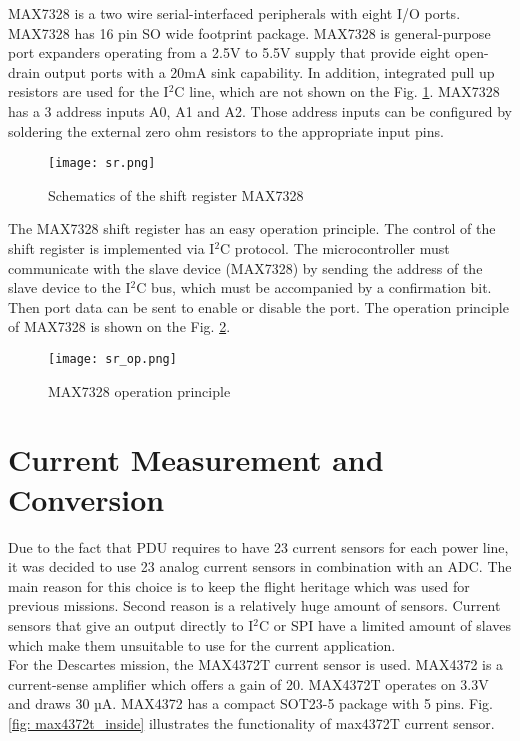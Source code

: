  MAX7328 is a two wire  serial-interfaced peripherals with eight I/O ports. MAX7328 has 16 pin SO wide footprint package. \cite{29} MAX7328 is general-purpose port expanders operating from a 2.5V to 5.5V supply that provide eight open-drain output ports with a 20mA sink capability. In addition, integrated pull up resistors are used for the I$^2$C line, which are not shown on the Fig. \ref{fig: sr1}.       MAX7328 has a 3 address inputs A0, A1 and A2. Those address inputs can be configured by soldering the external zero ohm resistors to the appropriate input pins.  


\begin{figure}[h]
	\centering
	\texttt{[image: sr.png]}
	\caption{ Schematics of the shift register MAX7328}
	\label{fig: sr1}
\end{figure}

The MAX7328 shift register has an easy operation principle. The control of the shift register is implemented via I$^2$C protocol. The microcontroller must communicate with the slave device (MAX7328) by sending the address of the slave device to the I$^2$C bus, which must be accompanied by a confirmation bit. Then port data can be sent to enable or disable the port. The operation principle of MAX7328 is shown on the Fig. \ref{fig: sr_op1}. 
\newpage
\begin{figure}[h]
	\centering
	\texttt{[image: sr\_op.png]}
	\caption{ MAX7328 operation principle\cite{29}}
	\label{fig: sr_op1}
\end{figure}
 
\section{Current Measurement and Conversion}

Due to the fact that PDU requires to have 23 current sensors for each power line, it was decided to use 23 analog current sensors in combination with an ADC. The main reason for this choice is to keep the flight heritage which was used for previous missions. Second reason is a relatively huge amount of sensors. Current sensors that give an output directly to I$^2$C or SPI have a limited amount of slaves which make them unsuitable to use for the current application.\\

For the Descartes mission, the MAX4372T current sensor is used. MAX4372 is a current-sense amplifier which offers a gain of 20. MAX4372T operates on 3.3V and draws 30 µA. MAX4372 has a compact SOT23-5 package with 5 pins. Fig. \ref{fig: max4372t_inside} illustrates the functionality of max4372T current sensor.

